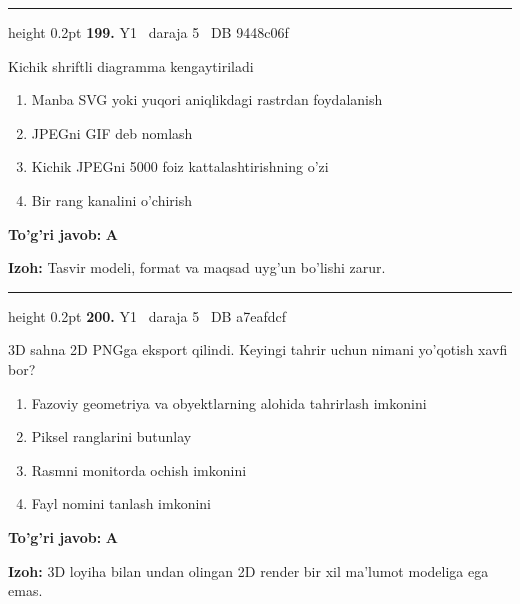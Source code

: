 \documentclass[10pt,a4paper,oneside]{article}
\begin{document}
\vspace{2mm}\hrule height 0.2pt \vspace{4mm}
\hypertarget{q199}{\textbf{\color{ink}199.}}  {\color{muted}\scriptsize Y1 \textbullet\ daraja 5 \textbullet\ DB 9448c06f}
\par
Kichik shriftli diagramma kengaytiriladi
\begin{enumerate}[label=\Alph*),leftmargin=9mm]
\item Manba SVG yoki yuqori aniqlikdagi rastrdan foydalanish
\item JPEGni GIF deb nomlash
\item Kichik JPEGni 5000 foiz kattalashtirishning o'zi
\item Bir rang kanalini o'chirish
\end{enumerate}
\begin{tcolorbox}[enhanced,breakable,colback=teal!4,colframe=teal!45!black,boxrule=0.45pt,arc=1.2mm,left=2.8mm,right=2.8mm,top=2mm,bottom=2mm,before skip=2mm,after skip=2mm]
\textbf{\color{teal}To'g'ri javob:} \textbf{A}
\par\smallskip
\textbf{Izoh:} Tasvir modeli, format va maqsad uyg'un bo'lishi zarur.
\end{tcolorbox}
\vspace{2mm}\hrule height 0.2pt \vspace{4mm}
\hypertarget{q200}{\textbf{\color{ink}200.}}  {\color{muted}\scriptsize Y1 \textbullet\ daraja 5 \textbullet\ DB a7eafdcf}
\par
3D sahna 2D PNGga eksport qilindi. Keyingi tahrir uchun nimani yo'qotish xavfi bor?
\begin{enumerate}[label=\Alph*),leftmargin=9mm]
\item Fazoviy geometriya va obyektlarning alohida tahrirlash imkonini
\item Piksel ranglarini butunlay
\item Rasmni monitorda ochish imkonini
\item Fayl nomini tanlash imkonini
\end{enumerate}
\begin{tcolorbox}[enhanced,breakable,colback=teal!4,colframe=teal!45!black,boxrule=0.45pt,arc=1.2mm,left=2.8mm,right=2.8mm,top=2mm,bottom=2mm,before skip=2mm,after skip=2mm]
\textbf{\color{teal}To'g'ri javob:} \textbf{A}
\par\smallskip
\textbf{Izoh:} 3D loyiha bilan undan olingan 2D render bir xil ma'lumot modeliga ega emas.
\end{tcolorbox}
\end{document}
